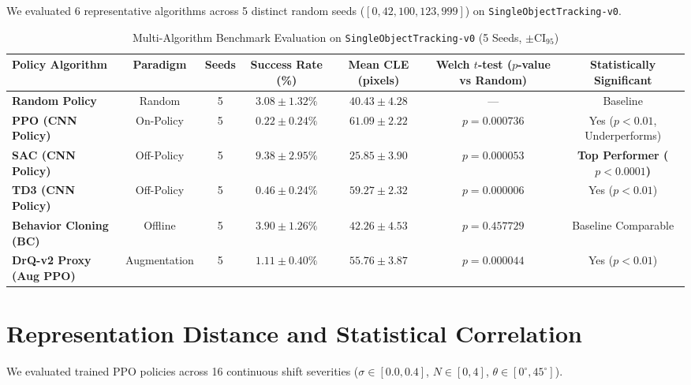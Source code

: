 \documentclass[journal]{IEEEtran}
\begin{document}
We evaluated 6 representative algorithms across 5 distinct random seeds ($[0, 42, 100, 123, 999]$) on \texttt{SingleObjectTracking-v0}.

\begin{table}[t]
\centering
\caption{Multi-Algorithm Benchmark Evaluation on \texttt{SingleObjectTracking-v0} (5 Seeds, $\pm \text{CI}_{95}$)}
\label{tab:baselines}
\begin{tabular}{lcccccc}
\toprule
\textbf{Policy Algorithm} & \textbf{Paradigm} & \textbf{Seeds} & \textbf{Success Rate (\%)} & \textbf{Mean CLE (pixels)} & \textbf{Welch $t$-test ($p$-value vs Random)} & \textbf{Statistically Significant} \\
\midrule
\textbf{Random Policy} & Random & 5 & $3.08 \pm 1.32\%$ & $40.43 \pm 4.28$ & --- & Baseline \\
\textbf{PPO (CNN Policy)} & On-Policy & 5 & $0.22 \pm 0.24\%$ & $61.09 \pm 2.22$ & $p = 0.000736$ & Yes ($p < 0.01$, Underperforms) \\
\textbf{SAC (CNN Policy)} & Off-Policy & 5 & \textbf{$9.38 \pm 2.95\%$} & \textbf{$25.85 \pm 3.90$} & \textbf{$p = 0.000053$} & \textbf{Top Performer ($p < 0.0001$)} \\
\textbf{TD3 (CNN Policy)} & Off-Policy & 5 & $0.46 \pm 0.24\%$ & $59.27 \pm 2.32$ & $p = 0.000006$ & Yes ($p < 0.01$) \\
\textbf{Behavior Cloning (BC)} & Offline & 5 & $3.90 \pm 1.26\%$ & $42.26 \pm 4.53$ & $p = 0.457729$ & Baseline Comparable \\
\textbf{DrQ-v2 Proxy (Aug PPO)} & Augmentation & 5 & $1.11 \pm 0.40\%$ & $55.76 \pm 3.87$ & $p = 0.000044$ & Yes ($p < 0.01$) \\
\bottomrule
\end{tabular}
\end{table}

\section{Representation Distance and Statistical Correlation}

We evaluated trained PPO policies across 16 continuous shift severities ($\sigma \in [0.0, 0.4]$, $N \in [0, 4]$, $\theta \in [0^\circ, 45^\circ]$).
\end{document}
